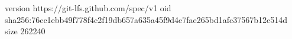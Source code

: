 version https://git-lfs.github.com/spec/v1
oid sha256:76cc1ebb49f778f4c2f19db657a635a45f9d4e7fae265bd1afc37567b12c514d
size 262240
